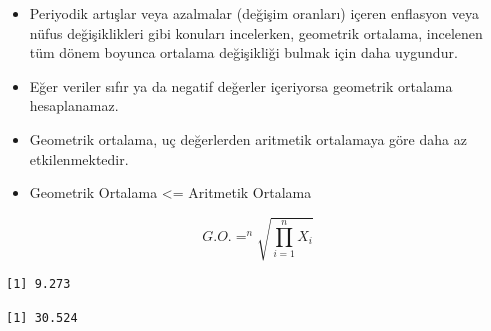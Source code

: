 \documentclass[
  letterpaper,
  DIV=11,
  numbers=noendperiod]{scrreprt}
\newenvironment{Shaded}{\begin{snugshade}}{\end{snugshade}}
\newcommand{\CommentTok}[1]{\textcolor[rgb]{0.37,0.37,0.37}{#1}}
\newcommand{\ControlFlowTok}[1]{\textcolor[rgb]{0.00,0.23,0.31}{#1}}
\newcommand{\DecValTok}[1]{\textcolor[rgb]{0.68,0.00,0.00}{#1}}
\newcommand{\FunctionTok}[1]{\textcolor[rgb]{0.28,0.35,0.67}{#1}}
\newcommand{\NormalTok}[1]{\textcolor[rgb]{0.00,0.23,0.31}{#1}}
\newcommand{\OtherTok}[1]{\textcolor[rgb]{0.00,0.23,0.31}{#1}}
\newcommand{\SpecialCharTok}[1]{\textcolor[rgb]{0.37,0.37,0.37}{#1}}
\begin{document}
\begin{itemize}
\item
  Periyodik artışlar veya azalmalar (değişim oranları) içeren enflasyon
  veya nüfus değişiklikleri gibi konuları incelerken, geometrik
  ortalama, incelenen tüm dönem boyunca ortalama değişikliği bulmak için
  daha uygundur.
\item
  Eğer veriler sıfır ya da negatif değerler içeriyorsa geometrik
  ortalama hesaplanamaz.
\item
  Geometrik ortalama, uç değerlerden aritmetik ortalamaya göre daha az
  etkilenmektedir.
\item
  Geometrik Ortalama \textless= Aritmetik Ortalama
\end{itemize}

\[ G.O. = ^n\sqrt{\prod_{i=1}^{n}X_i} \]

\begin{Shaded}
\end{Shaded}

\begin{verbatim}
[1] 9.273
\end{verbatim}

\begin{Shaded}
\end{Shaded}

\begin{verbatim}
[1] 30.524
\end{verbatim}

\begin{Shaded}
\end{Shaded}
\end{document}
